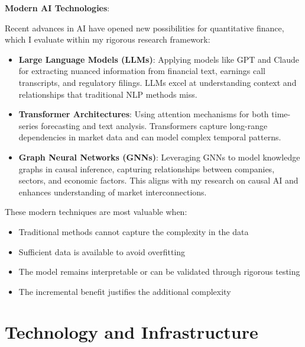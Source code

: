 \documentclass[11pt, letterpaper]{article}
\begin{document}
  \textbf{Modern AI Technologies}:

  Recent advances in AI have opened new possibilities for quantitative finance,
  which I evaluate within my rigorous research framework:

  \begin{itemize}
    \item \textbf{Large Language Models (LLMs)}: Applying models like GPT
      and Claude for extracting nuanced information from financial text,
      earnings call transcripts, and regulatory filings. LLMs excel at
      understanding context and relationships that traditional NLP
      methods miss.

    \item \textbf{Transformer Architectures}: Using attention mechanisms
      for both time-series forecasting and text analysis. Transformers
      capture long-range dependencies in market data and can model
      complex temporal patterns.

    \item \textbf{Graph Neural Networks (GNNs)}: Leveraging GNNs to model
      knowledge graphs in causal inference, capturing relationships
      between companies, sectors, and economic factors. This aligns with
      my research on causal AI and enhances understanding of market interconnections.
  \end{itemize}

  These modern techniques are most valuable when:

  \begin{itemize}
    \item Traditional methods cannot capture the complexity in the data

    \item Sufficient data is available to avoid overfitting

    \item The model remains interpretable or can be validated through rigorous
      testing

    \item The incremental benefit justifies the additional complexity
  \end{itemize}

  \section{Technology and Infrastructure}
  \label{technology-and-infrastructure}
\end{document}
